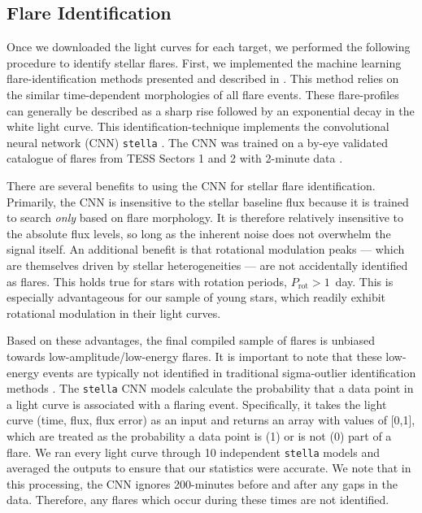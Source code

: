 \documentclass[twocolumn, linenumbers]{aastex631}
\begin{document}
\subsection{Flare Identification}\label{subsec2:Flareidentification}

Once we downloaded the light curves for each target, we performed the following procedure to identify stellar flares. First, we implemented the machine learning flare-identification
methods presented and described in \cite{feinstein20}. This method relies on the similar time-dependent morphologies of all flare events. These flare-profiles can generally be
described as a sharp rise followed by an exponential decay in the white light curve. This identification-technique implements the convolutional neural network (CNN) \texttt{stella}
\citep{feinstein20}. The CNN  was trained on  a   by-eye validated catalogue of flares from TESS Sectors 1 and 2 with 2-minute data \citep{guenther19_flares}.

There are several benefits to using the CNN for stellar flare identification. Primarily, the CNN is insensitive to the stellar baseline flux because it is trained to search
\textit{only} based on flare morphology. It is therefore relatively insensitive to the absolute flux levels, so long as the inherent noise does not overwhelm the signal itself.
An additional benefit is that rotational modulation peaks --- which are themselves driven by stellar heterogeneities --- are not accidentally identified as flares. This holds true
for stars with rotation periods, $P_\textrm{rot} > 1$~day. This is especially advantageous for our sample of young stars, which readily exhibit rotational modulation in their light curves.

Based on these advantages, the final compiled sample of flares is unbiased towards low-amplitude/low-energy flares. It is important to note that these low-energy events are typically
not identified in traditional sigma-outlier identification
methods \citep{chang15}. The \texttt{stella} CNN models calculate the probability that a data point in a light curve is associated with a flaring event. Specifically, it takes the light
curve (time, flux, flux error) as an input and returns an array with values of [0,1], which are treated as the probability a data point is (1) or is not (0) part of a flare. We ran every
light curve through 10 independent \texttt{stella} models and averaged the outputs to ensure that our statistics were accurate. We note that in this processing, the CNN ignores 200-minutes
before and after any gaps in the data. Therefore, any flares which occur during these times are not identified.
\end{document}
